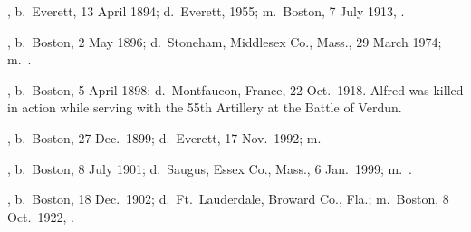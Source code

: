 \begin{Kids}
	, b.\ Everett, 13 April 1894;\cite{Robert5McGurinBirth} d.\ Everett, 1955;\cite{Robert5McGurinDeath} m.\ Boston, 7 July 1913, .\cite{Robert5McGurinMarriage}
	
	, b.\ Boston, 2 May 1896;\cite{Walter5McGurinBirth} d.\ Stoneham, Middlesex Co., Mass., 29 March 1974;\cite{Walter5McGurinDeath} m.\ .\cite{Walter5McGurinDeath}
	
	, b.\ Boston, 5 April 1898;\cite{Alfred5McGurinBirth} d.\ Montfaucon, France, 22 Oct.\ 1918.\cite{Alfred5McGurinDeath} Alfred was killed in action while serving with the 55th Artillery at the Battle of Verdun.\cite{Alfred5McGurinDeath2}
	
	, b.\ Boston, 27 Dec.\ 1899;\cite{Margaret5McGurinBirth} d.\ Everett, 17 Nov.\ 1992;\cite{Margaret5McGurinDeath} m.\ \cite{Margaret5McGurinDeath}
	
	, b.\ Boston, 8 July 1901;\cite{Sarah5McGurinBirth} d.\ Saugus, Essex Co., Mass., 6 Jan.\ 1999;\cite{Sarah5McGurinDeath} m.\ .\cite{Sarah5McGurinDeath}
	
	, b.\ Boston, 18 Dec.\ 1902;\cite{Edward5McGurinBirth} d.\ Ft.\ Lauderdale, Broward Co., Fla.;\cite{Edward5McGurinDeath} m.\ Boston, 8 Oct.\ 1922, .\cite{Edward5McGurinMarriage}
	

\end{Kids}
